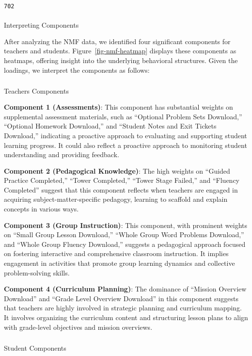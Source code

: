 \documentclass[
  number,
  preprint,
  3p,
  onecolumn]{elsarticle}
\makeatletter
\let\oldparagraph\paragraph
\renewcommand{\paragraph}{
    \@ifstar
      \xxxParagraphStar
      \xxxParagraphNoStar
  }
\newcommand{\xxxParagraphStar}[1]{\oldparagraph*{#1}\mbox{}}
\newcommand{\xxxParagraphNoStar}[1]{\oldparagraph{#1}\mbox{}}
\let\oldsubparagraph\subparagraph
\renewcommand{\subparagraph}{
    \@ifstar
      \xxxSubParagraphStar
      \xxxSubParagraphNoStar
  }
\newcommand{\xxxSubParagraphStar}[1]{\oldsubparagraph*{#1}\mbox{}}
\newcommand{\xxxSubParagraphNoStar}[1]{\oldsubparagraph{#1}\mbox{}}
\makeatother
\begin{document}
\begin{verbatim}
702
\end{verbatim}

\paragraph{Interpreting Components}\label{interpreting-components}

After analyzing the NMF data, we identified four significant components
for teachers and students. Figure~\ref{fig-nmf-heatmap} displays these
components as heatmaps, offering insight into the underlying behavioral
structures. Given the loadings, we interpret the components as follows:

\subparagraph{Teachers Components}\label{teachers-components}

\textbf{Component 1 (Assessments)}: This component has substantial
weights on supplemental assessment materials, such as ``Optional Problem
Sets Download,'' ``Optional Homework Download,'' and ``Student Notes and
Exit Tickets Download,'' indicating a proactive approach to evaluating
and supporting student learning progress. It could also reflect a
proactive approach to monitoring student understanding and providing
feedback.

\textbf{Component 2 (Pedagogical Knowledge)}: The high weights on
``Guided Practice Completed,'' ``Tower Completed,'' ``Tower Stage
Failed,'' and ``Fluency Completed'' suggest that this component reflects
when teachers are engaged in acquiring subject-matter-specific pedagogy,
learning to scaffold and explain concepts in various ways.

\textbf{Component 3 (Group Instruction)}: This component, with prominent
weights on ``Small Group Lesson Download,'' ``Whole Group Word Problems
Download,'' and ``Whole Group Fluency Download,'' suggests a pedagogical
approach focused on fostering interactive and comprehensive classroom
instruction. It implies engagement in activities that promote group
learning dynamics and collective problem-solving skills.

\textbf{Component 4 (Curriculum Planning)}: The dominance of ``Mission
Overview Download'' and ``Grade Level Overview Download'' in this
component suggests that teachers are highly involved in strategic
planning and curriculum mapping. It involves organizing the curriculum
content and structuring lesson plans to align with grade-level
objectives and mission overviews.

\subparagraph{Student Components}\label{student-components}
\end{document}
